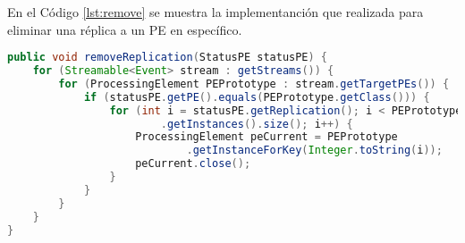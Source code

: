 En el Código \ref{lst:remove} se muestra la implementanción que realizada para eliminar una réplica a un PE en específico.

\begin{lstlisting}[caption={Eliminar r\'eplicas a un PE en S4.},label={lst:remove},language=Java]
public void removeReplication(StatusPE statusPE) {
	for (Streamable<Event> stream : getStreams()) {
		for (ProcessingElement PEPrototype : stream.getTargetPEs()) {
			if (statusPE.getPE().equals(PEPrototype.getClass())) {
				for (int i = statusPE.getReplication(); i < PEPrototype
						.getInstances().size(); i++) {
					ProcessingElement peCurrent = PEPrototype
							.getInstanceForKey(Integer.toString(i));
					peCurrent.close();
				}
			}
		}
	}
}
\end{lstlisting}